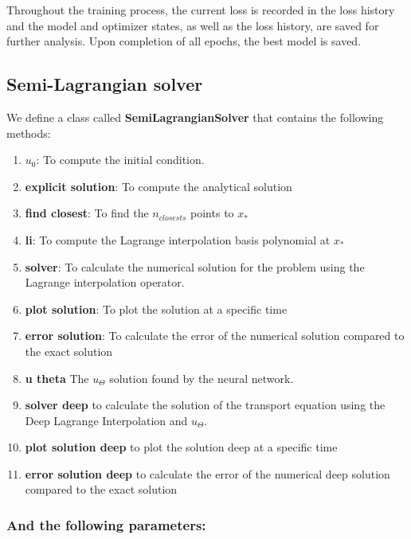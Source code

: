 \documentclass{article}
\begin{document}
Throughout the training process, the current loss is recorded in the loss history and the model and optimizer states, as well as the loss history, are saved for further analysis. Upon completion of all epochs, the best model is saved.

\subsection{Semi-Lagrangian solver}

We define a class called \textbf{SemiLagrangianSolver} that contains the following methods:

\begin{enumerate}
   \item \textbf{$u_0$}: To compute the initial condition.
   \item \textbf{explicit solution}: To compute the analytical solution
   \item \textbf{find closest}: To find the $n_{closests}$ points to $x_{*}$
   \item \textbf{li}: To compute the Lagrange interpolation basis polynomial at $x_{*}$
   \item \textbf{solver}: To calculate the numerical solution for the problem using the Lagrange interpolation operator.
   \item \textbf{plot solution}: To plot the solution at a specific time
   \item \textbf{error solution}: To calculate the error of the numerical solution compared to the exact solution
   \item \textbf{u theta}  The $u_{\Theta}$ solution found by the neural network.
   \item \textbf{solver deep} to calculate the solution of the transport equation using the Deep Lagrange Interpolation and $u_{\Theta}$.
   \item \textbf{plot solution deep} to plot the solution deep at a specific time
   \item \textbf{error solution deep} to calculate the error of the numerical deep solution compared to the exact solution
\end{enumerate}

\subsubsection*{And the following parameters:}
\end{document}
